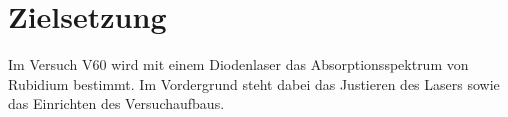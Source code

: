 \section{Zielsetzung}
\label{sec:Zielsetzung}

Im Versuch V60 wird mit einem Diodenlaser das Absorptionsspektrum von Rubidium bestimmt.
Im Vordergrund steht dabei das Justieren des Lasers sowie das Einrichten des Versuchaufbaus.